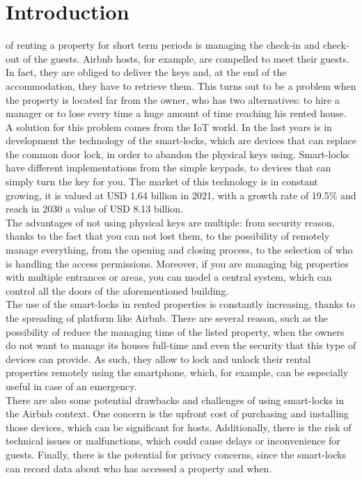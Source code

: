 \chapter{Introduction}
\label{introduction}

 of renting a property for short term periods is managing the check-in and check-out of the guests. Airbnb hosts, for example, are compelled to meet their guests. In fact, they are obliged to deliver the keys and, at the end of the accommodation, they have to retrieve them. This turns out to be a problem when the property is located far from the owner, who has two alternatives: to hire a manager or to lose every time a huge amount of time reaching his rented house. 
\\ A solution for this problem comes from the \gls{IoT} world. In the last years is in development the technology of the smart-locks, which are devices that can replace the common door lock, in order to abandon the physical keys using. Smart-locks have different implementations from the simple keypads, to devices that can simply turn the key for you. The market of this technology is in constant growing, it is valued at USD 1.64 billion in 2021, with a growth rate of 19.5\% and reach in 2030 a value of USD 8.13 billion\cite{marketsize}.
\\ The advantages of not using physical keys are multiple: from security reason, thanks to the fact that you can not lost them, to the possibility of remotely manage everything, from the opening and closing process, to the selection of who is handling the access permissions. Moreover, if you are managing big properties with multiple entrances or areas, you can model a central system, which can control all the doors of the aforementioned building. 
\\ The use of the smart-locks in rented properties is constantly increasing, thanks to the spreading of platform like Airbnb. There are several reason, such as the possibility of reduce the managing time of the listed property, when the owners do not want to manage its houses full-time and even the security that this type of devices can provide. As such, they allow to lock and unlock their rental properties remotely using the smartphone, which, for example, can be especially useful in case of an emergency.
\\ There are also some potential drawbacks and challenges of using smart-locks in the Airbnb context. One concern is the upfront cost of purchasing and installing those devices, which can be significant for hosts. Additionally, there is the risk of technical issues or malfunctions, which could cause delays or inconvenience for guests. Finally, there is the potential for privacy concerns, since the smart-locks can record data about who has accessed a property and when.
